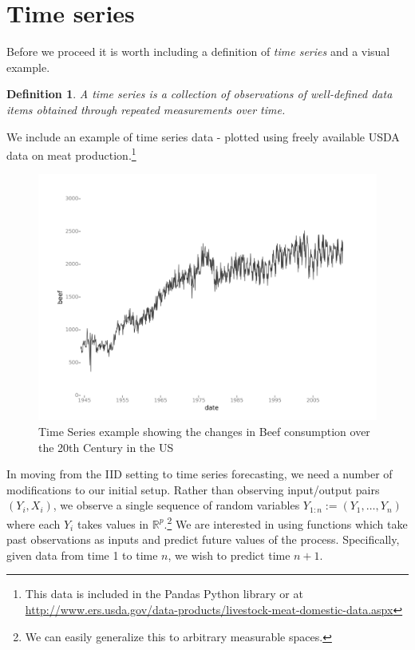\documentclass[12pt, oneside, a4paper]{article}
\theoremstyle{plain}
\newtheorem{definition}[theorem]{Definition}
\newcommand{\R}{\mathbb{R}}
\newcommand{\Yij}[2]{Y_{#1:#2}}
\newcommand{\Yin}{\Yij{1}{n}}
\theoremstyle{definition}
\begin{document}
\section{Time series}
\label{sec:dependence}
Before we proceed it is worth including a definition of \emph{time series}
and a visual example.
\begin{definition}
 A time series is a collection of observations 
of well-defined data items obtained through repeated measurements over time.
\end{definition}
We include an example of time series data - plotted using freely available USDA data on meat production.\footnote{
This data is included in the Pandas Python library\cite{Pandas}
 or at \url{http://www.ers.usda.gov/data-products/livestock-meat-domestic-data.aspx}}
\begin{figure}[ht]
 \centering
 \includegraphics[bb=0 0 792 576,scale=0.5]{timeseries.png}
 \caption{Time Series example showing the changes in Beef consumption over the 20th Century in the US}
 \label{fig:Time Series of USDA Meat Data}
\end{figure}


In moving from the IID setting to time series forecasting, we need a number of
modifications to our initial setup.  Rather than observing input/output pairs
$(Y_i,X_i)$, we observe a single sequence of random variables
$\Yin:=(Y_1,\ldots,Y_n)$ where each $Y_i$ takes values in
$\R^p$.\footnote{We can easily generalize this to arbitrary
  measurable spaces.}  We are interested in using functions which
take past observations as inputs and predict future values of the process.
Specifically, given data from time 1 to time $n$, we wish to predict time
$n+1$.
\end{document}
